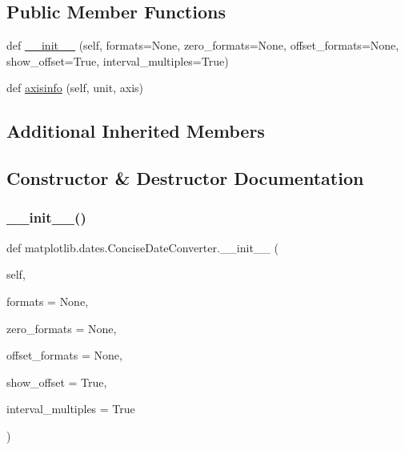 \subsection*{Public Member Functions}
\begin{DoxyCompactItemize}
\item 
def \hyperlink{classmatplotlib_1_1dates_1_1ConciseDateConverter_ae6953a680dd214a8d4d287aea2f0f615}{\+\_\+\+\_\+init\+\_\+\+\_\+} (self, formats=None, zero\+\_\+formats=None, offset\+\_\+formats=None, show\+\_\+offset=True, interval\+\_\+multiples=True)
\item 
def \hyperlink{classmatplotlib_1_1dates_1_1ConciseDateConverter_a8cb103029848b37103ff22ac51bb3b04}{axisinfo} (self, unit, axis)
\end{DoxyCompactItemize}
\subsection*{Additional Inherited Members}


\subsection{Constructor \& Destructor Documentation}
\mbox{\label{classmatplotlib_1_1dates_1_1ConciseDateConverter_ae6953a680dd214a8d4d287aea2f0f615}} 
\subsubsection{\texorpdfstring{\+\_\+\+\_\+init\+\_\+\+\_\+()}{\_\_init\_\_()}}
{\footnotesize\ttfamily def matplotlib.\+dates.\+Concise\+Date\+Converter.\+\_\+\+\_\+init\+\_\+\+\_\+ (\begin{DoxyParamCaption}\item[{}]{self,  }\item[{}]{formats = {\ttfamily None},  }\item[{}]{zero\+\_\+formats = {\ttfamily None},  }\item[{}]{offset\+\_\+formats = {\ttfamily None},  }\item[{}]{show\+\_\+offset = {\ttfamily True},  }\item[{}]{interval\+\_\+multiples = {\ttfamily True} }\end{DoxyParamCaption})}



